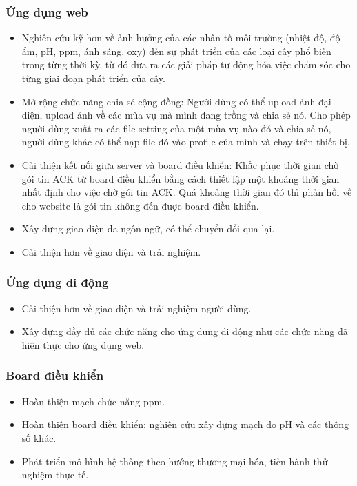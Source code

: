 \documentclass[a4paper,12pt,oneside]{article}
\begin{document}
\subsubsection{Ứng dụng web}
\begin{itemize}
\item Nghiên cứu kỹ hơn về ảnh hưởng của các nhân tố môi trường (nhiệt độ, độ ẩm, pH, ppm, ánh sáng, oxy) đến sự phát triển của các loại cây phổ biến trong từng thời kỳ, từ đó đưa ra các giải pháp tự động hóa việc chăm sóc cho từng giai đoạn phát triển của cây.
\item Mở rộng chức năng chia sẻ cộng đồng: Người dùng có thể upload ảnh đại diện, upload ảnh về các mùa vụ mà mình đang trồng và chia sẻ nó. Cho phép người dùng xuất ra các file setting của một mùa vụ nào đó và chia sẻ nó, người dùng khác có thể nạp file đó vào profile của mình và chạy trên thiết bị.
\item Cải thiện kết nối giữa server và board điều khiển: Khắc phục thời gian chờ gói tin ACK từ board điều khiển bằng cách thiết lập một khoảng thời gian nhất định cho việc chờ gói tin ACK. Quá khoảng thời gian đó thì phản hồi về cho website là gói tin không đến được board điều khiển.
\item Xây dựng giao diện đa ngôn ngữ, có thể chuyển đổi qua lại.
\item Cải thiện hơn về giao diện và trải nghiệm.
\end{itemize}

\subsubsection{Ứng dụng di động}
\begin{itemize}
\item Cải thiện hơn về giao diện và trải nghiệm người dùng.
\item Xây dựng đầy đủ các chức năng cho ứng dụng di động như các chức năng đã hiện thực cho ứng dụng web.
\end{itemize}

\subsubsection{Board điều khiển}
\begin{itemize}
\item Hoàn thiện mạch chức năng ppm.
\item Hoàn thiện board điều khiển: nghiên cứu xây dựng mạch đo pH và các thông số khác.
\item Phát triển mô hình hệ thống theo hướng thương mại hóa, tiến hành thử nghiệm thực tế.
\end{itemize}
\end{document}
